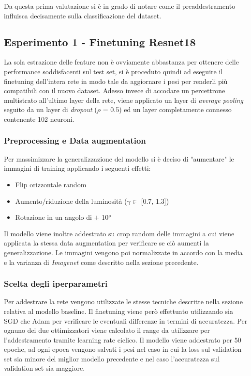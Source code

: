 Da questa prima valutazione si è in grado di notare come il preaddestramento influisca decisamente sulla classificazione del dataset.
\subsection{Esperimento 1 - Finetuning Resnet18}
La sola estrazione delle feature non è ovviamente abbastanza per ottenere delle performance soddisfacenti sul test set, si è proceduto quindi ad eseguire il finetuning dell'intera rete in modo tale da aggiornare i pesi per renderli più compatibili con il nuovo dataset.
Adesso invece di accodare un percettrone multistrato all'ultimo layer della rete, viene applicato un layer di \textit{average pooling} seguito da un layer di \textit{dropout} ($\rho$ = 0.5) ed un layer completamente connesso contenente 102 neuroni.
\subsubsection{Preprocessing e Data augmentation}
Per massimizzare la generalizzazione del modello si è deciso di "aumentare" le immagini di training applicando i seguenti effetti:
\begin{itemize}
\item Flip orizzontale random
\item Aumento/riduzione della luminosità ($ \gamma \in $ [0.7, 1.3])
\item Rotazione in un angolo di $\pm$ 10°
\end{itemize}
Il modello viene inoltre addestrato su crop random delle immagini a cui viene applicata la stessa data augmentation per verificare se ciò aumenti la generalizzazione.
Le immagini vengono poi normalizzate in accordo con la media e la varianza di \textit{Imagenet} come descritto nella sezione precedente.
\subsubsection{Scelta degli iperparametri}
Per addestrare la rete vengono utilizzate le stesse tecniche descritte nella sezione relativa al modello baseline. Il finetuning viene però effettuato utilizzando sia SGD che Adam \cite{kingma2014adam} per verificare le eventuali differenze in termini di accuratezza.
Per ognuno dei due ottimizzatori viene calcolato il range da utilizzare per l'addestramento tramite learning rate ciclico.
Il modello viene addestrato per 50 epoche, ad ogni epoca vengono salvati i pesi nel caso in cui la loss sul validation set sia minore del miglior modello precedente e nel caso l'accuratezza sul validation set sia maggiore.
